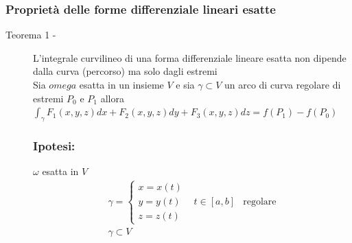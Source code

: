 \subsubsection{Proprietà delle forme differenziale lineari esatte}
\begin{description}
	\item[Teorema 1 -] L'integrale curvilineo di una forma differenziale
		lineare esatta non dipende dalla curva (percorso) ma solo dagli
		estremi\\
		Sia $omega$ esatta in un insieme $V$ e sia $\gamma \subset V$ un arco di
		curva regolare di estremi $P_0$ e $P_1$ allora $\displaystyle\int_\gamma
		F_1(x,y,z)dx + F_2(x,y,z) dy+ F_3(x,y,z)dz=f(P_1)-f(P_0)$
		\begin{multicols}{2}
			\subsubsection{Ipotesi:}
			$\omega$ esatta in $V$
			\begin{eqnarray*}
				\gamma=\begin{cases}
					x=x(t) \\
					y=y(t)\\
					z=z(t)
				\end{cases} & t\in[a,b] &\text{regolare}\\
				\gamma \subset V
			\end{eqnarray*}

\end{multicols}
\end{description}
